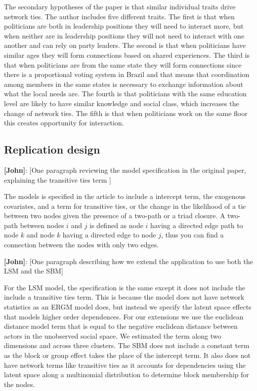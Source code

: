 \documentclass[fleqn,12pt]{wlscirep}
\begin{document}
The secondary hypotheses of the paper is that similar individual traits drive network ties. The author includes five different traits. The first is that when politicians are both in leadership positions they will need to interact more, but when neither are in leadership positions they will not need to interact with one another and can rely on party leaders. The second is that when politicians have similar ages they will form connections based on shared experiences.  The third is that when politicians are from the same state they will form connections since there is a proportional voting system in Brazil and that means that coordination among members in the same states is necessary to exchange information about what the local needs are. The fourth is that politicians with the same education level are likely to have similar knowledge and social class, which increases the change of network ties. The fifth is that when politicians work on the same floor this creates opportunity for interaction.


\subsection{Replication design}

 {\bf [John]}: [One paragraph reviewing the model specification in the original paper, explaining the transitive ties term ]
 
The models is specified in the article to include a intercept term, the exogenous covariates, and a term for transitive ties, or the change in the likelihood of a tie between two nodes given the presence of a two-path or a triad closure. A two-path between nodes $i$ and $j$ is defined as  node $i$ having a directed edge path to node $k$ and node $k$ having a directed edge to node $j$, thus you can find a connection between the nodes with only two edges.
 

 {\bf [John]}: [One paragraph describing how we extend the application to use both the LSM and the SBM]

For the LSM model, the specification is the same except it does not include the include a transitive ties term. This is because the model does not have network statistics as an ERGM model does, but instead we specify the latent space effects that models higher order dependences. For our extensions we use the euclidean distance model term that is equal to the negative euclidean distance between actors in the unobserved social space. We estimated the term along two dimensions and across three clusters. The SBM does not include a constant term as the block or group effect takes the place of the intercept term. It also does not have network terms like transitive ties as it accounts for dependencies using the latent space along a multinomial distribution to determine block membership for the nodes. 
\end{document}
